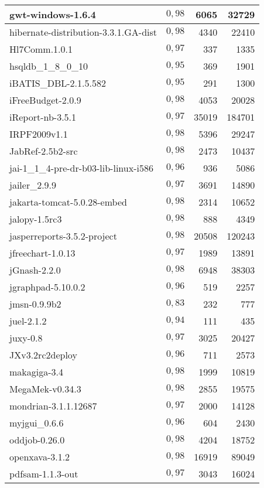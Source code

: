 \begin{center}
\begin{longtable}{| p{10cm} | c | r | r |}
	gwt-windows-1.6.4 &  $0,98$ & 6065 & 32729 \\ \hline
	hibernate-distribution-3.3.1.GA-dist &  $0,98$ & 4340 & 22410 \\ \hline
	Hl7Comm.1.0.1 &  $0,97$ & 337 & 1335 \\ \hline
	hsqldb\_1\_8\_0\_10 &  $0,95$ & 369 & 1901 \\ \hline
	iBATIS\_DBL-2.1.5.582 &  $0,95$ & 291 & 1300 \\ \hline
	iFreeBudget-2.0.9 &  $0,98$ & 4053 & 20028 \\ \hline
	iReport-nb-3.5.1 &  $0,97$ & 35019 & 184701 \\ \hline
	IRPF2009v1.1 &  $0,98$ & 5396 & 29247 \\ \hline
	JabRef-2.5b2-src &  $0,98$ & 2473 & 10437 \\ \hline
	jai-1\_1\_4-pre-dr-b03-lib-linux-i586 &  $0,96$ & 936 & 5086 \\ \hline
	jailer\_2.9.9 &  $0,97$ & 3691 & 14890 \\ \hline
	jakarta-tomcat-5.0.28-embed &  $0,98$ & 2314 & 10652 \\ \hline
	jalopy-1.5rc3 &  $0,98$ & 888 & 4349 \\ \hline
	jasperreports-3.5.2-project &  $0,98$ & 20508 & 120243 \\ \hline
	jfreechart-1.0.13 &  $0,97$ & 1989 & 13891 \\ \hline
	jGnash-2.2.0 &  $0,98$ & 6948 & 38303 \\ \hline
	jgraphpad-5.10.0.2 &  $0,96$ & 519 & 2257 \\ \hline
	jmsn-0.9.9b2 &  $0,83$ & 232 & 777 \\ \hline
	juel-2.1.2 &  $0,94$ & 111 & 435 \\ \hline
	juxy-0.8 &  $0,97$ & 3025 & 20427 \\ \hline
	JXv3.2rc2deploy &  $0,96$ & 711 & 2573 \\ \hline
	makagiga-3.4 &  $0,98$ & 1999 & 10819 \\ \hline
	MegaMek-v0.34.3 &  $0,98$ & 2855 & 19575 \\ \hline
	mondrian-3.1.1.12687 &  $0,97$ & 2000 & 14128 \\ \hline
	myjgui\_0.6.6 &  $0,96$ & 604 & 2430 \\ \hline
	oddjob-0.26.0 &  $0,98$ & 4204 & 18752 \\ \hline
	openxava-3.1.2 &  $0,98$ & 16919 & 89049 \\ \hline
	pdfsam-1.1.3-out &  $0,97$ & 3043 & 16024 \\ \hline

\end{longtable}
\end{center}
